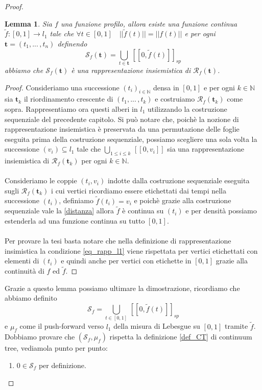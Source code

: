 \documentclass[11pt, twoside]{report}
\newcommand{\Ss}{\mathscr{S}}
\newcommand{\Rr}{\mathscr{R}}
\theoremstyle{definition}
\theoremstyle{plain}
\newtheorem{lemma}[teo]{Lemma}
\theoremstyle{remark}
\numberwithin{equation}{chapter}
\begin{document}
\begin{proof}
\begin{lemma}
Sia $f$ una funzione profilo, allora esiste una funzione continua $\tilde{f}:[0,1]\longrightarrow l_1$ tale che $\forall t\in [0,1] \quad ||\tilde{f}(t)||=||f(t)||$ e per ogni $\mathbf{t}=(t_1, ...\, , t_n)$ definendo 
$$ \Ss_f(\mathbf{t})= \bigcup\limits_{t\in \mathbf{t}} \,[[0,\tilde{f}(t)]]_{sp}$$
abbiamo che $\Ss_f(\mathbf{t})$ è una rappresentazione insiemistica di $\Rr_f(\mathbf{t})$.
\end{lemma}
\begin{proof}
Consideriamo una successione $(t_i)_{i\in \mathbb{N}}$ densa in $[0,1]$ e per ogni $k \in \mathbb{N}$ sia $\mathbf{t}_k$ il riordinamento crescente di $(t_1, ...\, , t_k)$ e costruiamo $\Rr_f(\mathbf{t}_k)$ come sopra. Rappresentiamo ora questi alberi in $l_1$ utilizzando la costruzione sequenziale del precedente capitolo. Si può notare che, poichè la nozione di rappresentazione insiemistica è preservata da una permutazione delle foglie eseguita prima della costruzione sequenziale, possiamo scegliere una sola volta la successione $(v_i) \subseteq l_1$ tale che $\bigcup\limits_{1\leq i\leq k}\, [[0, v_i]]$ sia una rappresentazione insiemistica di $\Rr_f(\mathbf{t}_k)$ per ogni $k\in \mathbb{N}$.\\
\\
Consideriamo le coppie $(t_i, v_i)$ indotte dalla costruzione sequenziale eseguita sugli $\Rr_f(\mathbf{t}_k)$ i cui vertici ricordiamo essere etichettati dai tempi nella successione $(t_i)$, definiamo $\tilde{f}(t_i)=v_i$ e poichè grazie alla costruzione sequenziale vale la \eqref{distanza} allora $\tilde{f}$ è continua su $(t_i)$ e per densità possiamo estenderla ad una funzione continua su tutto $[0,1]$.\\
\\
Per provare la tesi basta notare che nella definizione di rappresentazione insimistica la condizione \eqref{eq_rapp_l1} viene rispettata per vertici etichettati con elementi di $(t_i)$ e quindi anche per vertici con etichette in $[0,1]$ grazie alla continuità di $f$ ed $\tilde{f}$.
\end{proof}

Grazie a questo lemma possiamo ultimare la dimostrazione, ricordiamo che abbiamo definito
\begin{equation}\label{esse_di_effe}
\Ss_f=\bigcup\limits_{t\in[0,1]} \, [[0, \tilde{f}(t)]]_{sp}
\end{equation} 
e $\mu_f$ come il push-forward verso $l_1$ della misura di Lebesgue su $[0,1]$ tramite $\tilde{f}$.\\
Dobbiamo provare che $(\Ss_f, \mu_f)$ rispetta la definizione \ref{def_CT} di continuum tree, vediamola punto per punto:
\begin{enumerate}
\item $0\in \Ss_f$ per definizione.


\end{enumerate}
\end{proof}
\end{document}
